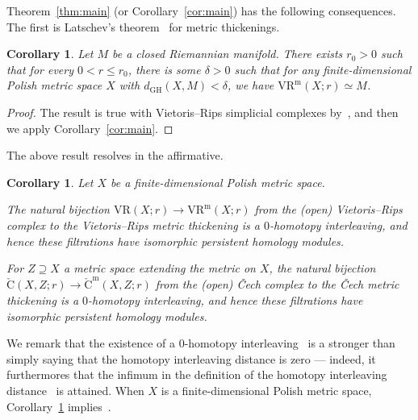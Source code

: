 \documentclass[11pt, reqno, english]{amsart}
\theoremstyle{plain}
\newtheorem{corollary}[lemma]{Corollary}
\theoremstyle{definition}
\theoremstyle{myremark}
\newcommand{\gh}{\mathrm{GH}}
\newcommand{\vr}[2]{\mathrm{VR}(#1;#2)}
\newcommand{\vrm}[2]{\mathrm{VR}^\mathrm{m}(#1;#2)}
\newcommand{\acech}[3]{\mathrm{\check{C}}(#1,#2;#3)}
\newcommand{\acechm}[3]{\mathrm{\check{C}}^\mathrm{m}(#1,#2;#3)}
\begin{document}
Theorem~\ref{thm:main} (or Corollary~\ref{cor:main}) has the following consequences.
The first is Latschev's theorem~\cite{Latschev2001} for metric thickenings.

\begin{corollary}
\label{cor:latschev}
Let $M$ be a closed Riemannian manifold.
There exists $r_0>0$ such that for every $0<r\le r_0$, there is some $\delta>0$ such that for any finite-dimensional Polish metric space $X$ with $d_\gh(X,M)<\delta$, we have $\vrm{X}{r}\simeq M$.
\end{corollary}

\begin{proof}
The result is true with Vietoris--Rips simplicial complexes by~\cite[Theorem~1.1]{Latschev2001}, and then we apply Corollary~\ref{cor:main}.
\end{proof}

The above result resolves \cite[Conjecture~6.9]{AAR} in the affirmative.

\begin{corollary}
\label{cor:interleaving}
Let $X$ be a finite-dimensional Polish metric space.

The natural bijection $\vr{X}{r}\to\vrm{X}{r}$ from the (open) Vietoris--Rips complex to the Vietoris--Rips metric thickening is a $0$-homotopy interleaving, and hence these filtrations have isomorphic persistent homology modules.

For $Z\supseteq X$ a metric space extending the metric on $X$, the natural bijection $\acech{X}{Z}{r}\to\acechm{X}{Z}{r}$ from the (open) \v{C}ech complex to the \v{C}ech metric thickening is a $0$-homotopy interleaving, and hence these filtrations have isomorphic persistent homology modules.
\end{corollary}

We remark that the existence of a $0$-homotopy interleaving~\cite[Definition~3.5]{blumberg2023universality} is a stronger than simply saying that the homotopy interleaving distance is zero --- indeed, it furthermores that the infimum in the definition of the homotopy interleaving distance~\cite[Definition~3.6]{blumberg2023universality} is attained.
When $X$ is a finite-dimensional Polish metric space, Corollary~\ref{cor:interleaving} implies~\cite[Corollary~3]{gillespie2024vietoris}.
\end{document}
